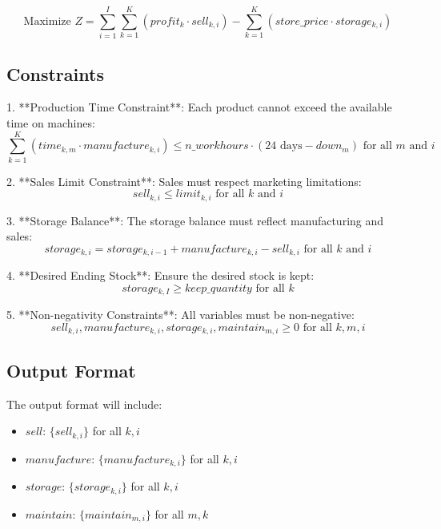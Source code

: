 \documentclass{article}
\begin{document}
\[
\text{Maximize } Z = \sum_{i=1}^{I} \sum_{k=1}^{K} (profit_k \cdot sell_{k,i}) - \sum_{k=1}^{K} (store\_price \cdot storage_{k,i}) 
\]

\subsection*{Constraints}

1. **Production Time Constraint**: 
   Each product cannot exceed the available time on machines:
   \[
   \sum_{k=1}^{K} (time_{k,m} \cdot manufacture_{k,i}) \leq n\_workhours \cdot (24 \text{ days} - down_m) \text{ for all } m \text{ and } i
   \]

2. **Sales Limit Constraint**:
   Sales must respect marketing limitations:
   \[
   sell_{k,i} \leq limit_{k,i} \text{ for all } k \text{ and } i
   \]
  
3. **Storage Balance**:
   The storage balance must reflect manufacturing and sales:
   \[
   storage_{k,i} = storage_{k,i-1} + manufacture_{k,i} - sell_{k,i} \text{ for all } k \text{ and } i
   \]

4. **Desired Ending Stock**:
   Ensure the desired stock is kept:
   \[
   storage_{k,I} \geq keep\_quantity \text{ for all } k
   \]

5. **Non-negativity Constraints**:
   All variables must be non-negative:
   \[
   sell_{k,i}, manufacture_{k,i}, storage_{k,i}, maintain_{m,i} \geq 0 \text{ for all } k, m, i
   \]

\subsection*{Output Format}
The output format will include:

\begin{itemize}
    \item $sell$: $\{sell_{k,i}\}$ for all $k, i$ 
    \item $manufacture$: $\{manufacture_{k,i}\}$ for all $k, i$ 
    \item $storage$: $\{storage_{k,i}\}$ for all $k, i$ 
    \item $maintain$: $\{maintain_{m,i}\}$ for all $m, k$ 
\end{itemize}
\end{document}
